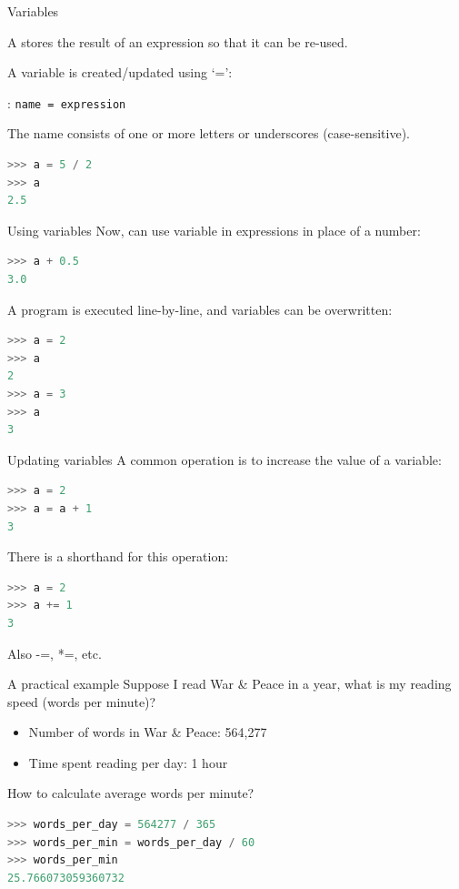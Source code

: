 \documentclass[aspectratio=169,usenames,dvipsnames]{beamer}
\begin{document}
\begin{frame}[fragile]{Variables}
    \begin{definition}
        A  stores the result of an expression
        so that it can be re-used.
    \end{definition}

A variable is created/updated using `=':

\begin{definition}
: \texttt{name = expression}

The name consists of one or more letters or underscores (case-sensitive).
\end{definition}

\begin{lstlisting}[language=python]
>>> a = 5 / 2
>>> a
2.5
\end{lstlisting}
\end{frame}

\begin{frame}[fragile]{Using variables}
Now, can use variable in expressions in place of a number:

\begin{lstlisting}[language=python]
>>> a + 0.5
3.0
\end{lstlisting}

\pause
A program is executed line-by-line, and variables can be overwritten:
\begin{lstlisting}[language=python]
>>> a = 2
>>> a
2
>>> a = 3
>>> a
3
\end{lstlisting}
\end{frame}


\begin{frame}[fragile]{Updating variables}
A common operation is to increase the value of a variable:
\begin{lstlisting}[language=python]
>>> a = 2
>>> a = a + 1
3
\end{lstlisting}

\pause
There is a shorthand for this operation:
\begin{lstlisting}[language=python]
>>> a = 2
>>> a += 1
3
\end{lstlisting}

Also -=, *=, etc.
\end{frame}


\begin{frame}[fragile]{A practical example}
    Suppose I read War \& Peace in a year,
    what is my reading speed (words per minute)?
    \begin{itemize}
        \item Number of words in War \& Peace: 564,277
        \item Time spent reading per day: 1 hour
    \end{itemize}
    How to calculate average words per minute?
    \pause

\begin{lstlisting}[language=python]
>>> words_per_day = 564277 / 365
>>> words_per_min = words_per_day / 60
>>> words_per_min
25.766073059360732
\end{lstlisting}
\end{frame}
\end{document}
